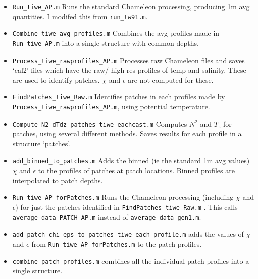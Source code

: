 \documentclass[11pt]{article}
\begin{document}
\begin{itemize}

\item \verb+Run_tiwe_AP.m+ Runs the standard Chameleon processing, producing 1m avg quantities. I modifed this from \verb+run_tw91.m+.

\item \verb+Combine_tiwe_avg_profiles.m+ Combines the avg profiles made in \verb+Run_tiwe_AP.m+ into a single structure with common depths.

\item \verb+Process_tiwe_rawprofiles_AP.m+  Processes raw Chameleon files and saves `cal2' files which have the raw/ high-res profiles of temp and salinity. These are used to identify patches. $\chi$ and $\epsilon$ are not computed for these.

\item \verb+FindPatches_tiwe_Raw.m+ Identifies patches in each profiles made by \verb+Process_tiwe_rawprofiles_AP.m+, using potential temperature.

\item \verb+Compute_N2_dTdz_patches_tiwe_eachcast.m+ Computes $N^2$ and $T_z$ for patches, using several different methods. Saves results for each profile in a structure `patches'.

\item \verb+add_binned_to_patches.m+ Adds the binned (ie the standard 1m avg values) $\chi$ and $\epsilon$ to the profiles of patches at patch locations. Binned profiles are interpolated to patch depths.

\item \verb+Run_tiwe_AP_forPatches.m+ Runs the Chameleon processing (including $\chi$ and $\epsilon$) for just the patches identified in \verb+FindPatches_tiwe_Raw.m+ . This calls \verb+average_data_PATCH_AP.m+ instead of \verb+average_data_gen1.m+.

\item \verb+add_patch_chi_eps_to_patches_tiwe_each_profile.m+ adds the values of $\chi$ and $\epsilon$ from \verb+Run_tiwe_AP_forPatches.m+ to the patch profiles.

\item \verb+combine_patch_profiles.m+ combines all the individual patch profiles into a single structure.


\end{itemize}

\medskip

\end{document}

